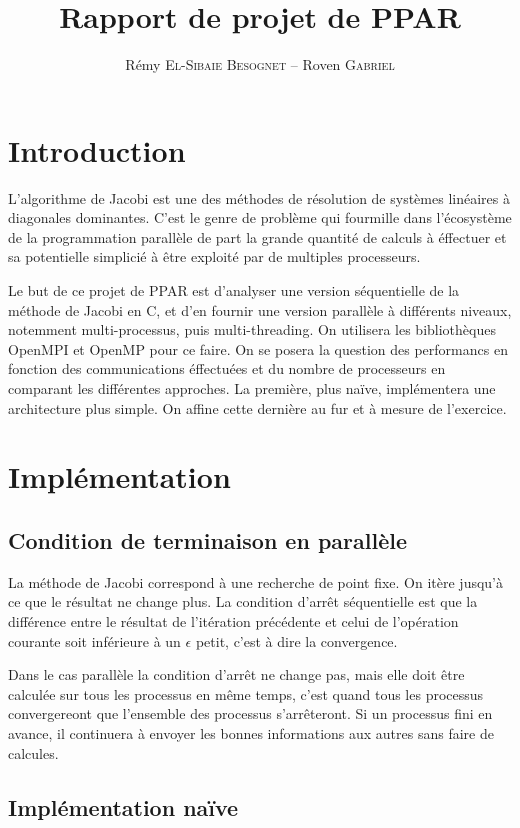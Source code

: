 \documentclass[a4paper]{article}
\title{Rapport de projet de PPAR}
\author{Rémy \textsc{El-Sibaie Besognet} -- Roven \textsc{Gabriel}}
\begin{document}
\maketitle


\section{Introduction}

L'algorithme de Jacobi est une des méthodes de résolution de systèmes
linéaires à diagonales dominantes. C'est le genre de problème qui
fourmille dans l'écosystème de la programmation parallèle de part la
grande quantité de calculs à éffectuer et sa potentielle simplicié à
être exploité par de multiples processeurs.

Le but de ce projet de PPAR est d'analyser une version séquentielle de
la méthode de Jacobi en C, et d'en fournir une version parallèle à
différents niveaux, notemment multi-processus, puis
multi-threading. On utilisera les bibliothèques OpenMPI et OpenMP pour
ce faire. On se posera la question des performancs en fonction des
communications éffectuées et du nombre de processeurs en comparant les
différentes approches. La première, plus naïve, implémentera une
architecture plus simple. On affine cette dernière au fur et à mesure
de l'exercice.

\section{Implémentation} 

\subsection{Condition de terminaison en parallèle}

La méthode de Jacobi correspond à une recherche de point fixe. On
itère jusqu'à ce que le résultat ne change plus. La condition d'arrêt
séquentielle est que la différence entre le résultat de l'itération
précédente et celui de l'opération courante soit inférieure à un
$\epsilon$ petit, c'est à dire la convergence.

Dans le cas parallèle la condition d'arrêt ne change pas, mais elle
doit être calculée sur tous les processus en même temps, c'est quand tous les
processus convergereont que l'ensemble des processus s'arrêteront. Si un
processus fini en avance, il continuera à envoyer les bonnes informations
aux autres sans faire de calcules.

\subsection{Implémentation naïve}
\end{document}
